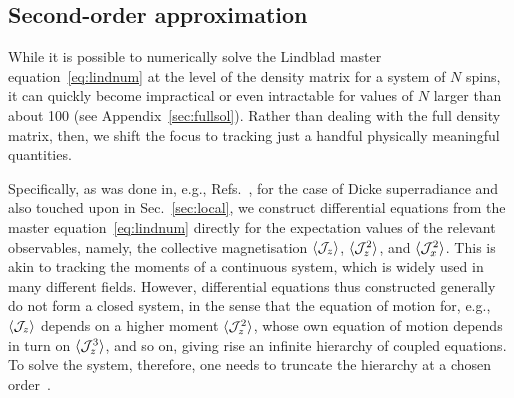 \documentclass[aps,prd,10pt,twocolumn,superscriptaddress,floatfix,nofootinbib,amsmath,amssymb,altaffilletter,preprintnumbers]{revtex4-1}
\begin{document}

\subsection{Second-order approximation}\label{sec:2ndorder}

While it is possible to numerically solve the Lindblad master equation~\eqref{eq:lindnum} at the level of the density matrix for a system of $N$ spins, it can quickly become impractical or even intractable for values of $N$ larger than about 100 (see Appendix~\ref{sec:fullsol}).
Rather than dealing with the full density matrix, then, we shift the focus to tracking just a handful  physically meaningful quantities.  

Specifically, as was done in, e.g., Refs.~\cite{Shammah_2017,carmichael1}, for the case of Dicke superradiance and also touched upon in Sec.~\ref{sec:local}, we construct  differential equations from the master equation~\eqref{eq:lindnum} directly for the expectation values of the relevant observables, namely, the collective magnetisation $\langle {\cal J}_z\rangle$, $\langle {\cal J}_z^2 \rangle$, and  $\langle {\cal J}_x^2 \rangle$.  This is akin to tracking the moments of a continuous system, which is widely used in many different fields.
However, differential equations thus constructed generally do not form a closed system, in the sense that the equation of motion for, e.g., $\langle {\cal J}_z \rangle$ depends on a higher moment $\langle {\cal J}_z^2 \rangle$, whose own equation of motion depends in turn on  $\langle {\cal J}_z^3 \rangle$, and so on, giving rise an infinite hierarchy of coupled equations.
To solve the system, therefore, one needs to truncate the hierarchy at a chosen order~\cite{Shammah_2017}.
\end{document}
